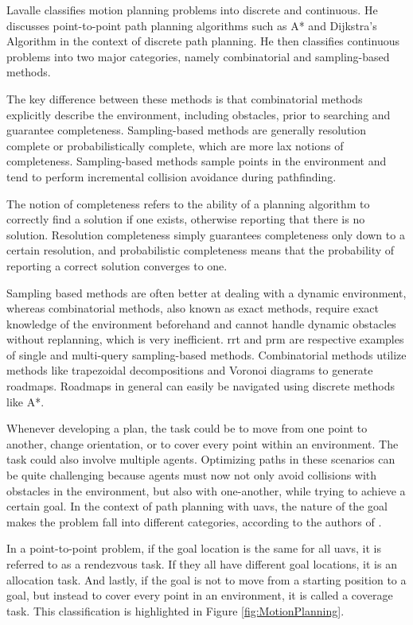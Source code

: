 Lavalle classifies motion planning problems into discrete and continuous. He discusses point-to-point path planning algorithms such as A* and Dijkstra's Algorithm in the context of discrete path planning. He then classifies continuous problems into two major categories, namely combinatorial and sampling-based methods.

The key difference between these methods is that combinatorial methods explicitly describe the environment, including obstacles, prior to searching and guarantee completeness. Sampling-based methods are generally resolution complete or probabilistically complete, which are more lax notions of completeness. Sampling-based methods sample points in the environment and tend to perform incremental collision avoidance during pathfinding. \cite{Lavalle2006}

The notion of completeness refers to the ability of a planning algorithm to correctly find a solution if one exists, otherwise reporting that there is no solution. Resolution completeness simply guarantees completeness only down to a certain resolution, and probabilistic completeness means that the probability of reporting a correct solution converges to one. \cite{Lavalle2006}

Sampling based methods are often better at dealing with a dynamic environment, whereas combinatorial methods, also known as exact methods, require exact knowledge of the environment beforehand and cannot handle dynamic obstacles without replanning, which is very inefficient. \ac{rrt} and \ac{prm} are respective examples of single and multi-query sampling-based methods. Combinatorial methods utilize methods like trapezoidal decompositions and Voronoi diagrams to generate roadmaps. Roadmaps in general can easily be navigated using discrete methods like A*. \cite{Lavalle2006}

Whenever developing a plan, the task could be to move from one point to another, change orientation, or to cover every point within an environment. The task could also involve multiple agents. Optimizing paths in these scenarios can be quite challenging because agents must now not only avoid collisions with obstacles in the environment, but also with one-another, while trying to achieve a certain goal. In the context of path planning with \acp{uav}, the nature of the goal makes the problem fall into different categories, according to the authors of \cite{Zhang2020}. 

In a point-to-point problem, if the goal location is the same for all \acp{uav}, it is referred to as a rendezvous task. If they all have different goal locations, it is an allocation task. And lastly, if the goal is not to move from a starting position to a goal, but instead to cover every point in an environment, it is called a coverage task. This classification is highlighted in Figure \ref{fig:MotionPlanning}.

